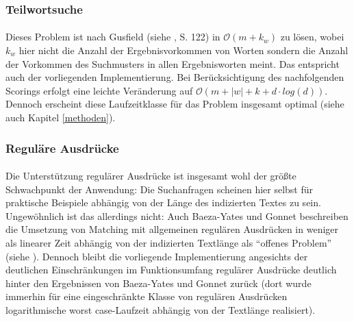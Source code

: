 
\subsubsection{Teilwortsuche}

\paragraph{} Dieses Problem ist nach Gusfield (siehe \cite{gusfield}, S. 122) in $\mathcal{O}(m + k_w)$ zu lösen, wobei $k_w$ hier nicht die Anzahl der Ergebnisvorkommen von Worten sondern die Anzahl der Vorkommen des Suchmusters in allen Ergebnisworten meint. Das entspricht auch der vorliegenden Implementierung. Bei Berücksichtigung des nachfolgenden Scorings erfolgt eine leichte Veränderung auf $\mathcal{O}(m + |w| + k + d \cdot log(d))$. Dennoch erscheint diese Laufzeitklasse für das Problem insgesamt optimal (siehe auch Kapitel \ref{methoden}).

\subsubsection{Reguläre Ausdrücke}

\paragraph{} Die Unterstützung regulärer Ausdrücke ist insgesamt wohl der größte Schwachpunkt der Anwendung: Die Suchanfragen scheinen hier selbst für praktische Beispiele abhängig von der Länge des indizierten Textes zu sein. Ungewöhnlich ist das allerdings nicht: Auch Baeza-Yates und Gonnet beschreiben die Umsetzung von Matching mit allgemeinen regulären Ausdrücken in weniger als linearer Zeit abhängig von der indizierten Textlänge als "`offenes Problem"' (siehe \cite{baeza-yates}). Dennoch bleibt die vorliegende Implementierung angesichts der deutlichen Einschränkungen im Funktionsumfang regulärer Ausdrücke deutlich hinter den Ergebnissen von Baeza-Yates und Gonnet zurück (dort wurde immerhin für eine eingeschränkte Klasse von regulären Ausdrücken logarithmische worst case-Laufzeit abhängig von der Textlänge realisiert).
